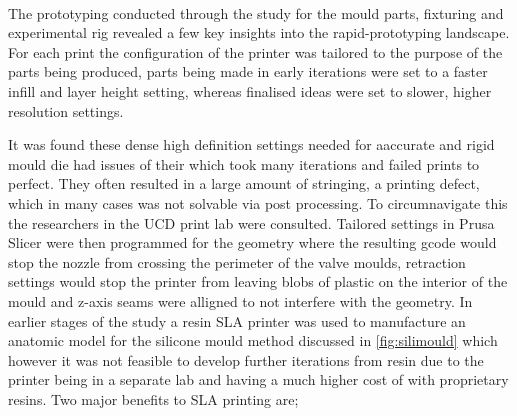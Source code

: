 \\
The prototyping conducted through the study for the mould parts, fixturing and experimental rig revealed a few key insights into the rapid-prototyping landscape. For each print the configuration of the printer was tailored to the purpose of the parts being produced, parts being made in early iterations were set to a faster infill and layer height setting, whereas finalised ideas were set to slower, higher resolution settings.

It was found these dense high definition settings needed for aaccurate and rigid mould die had issues of their which took many iterations and failed prints to perfect. They often resulted in a large amount of stringing, a printing defect, which in many cases was not solvable via post processing. To circumnavigate this the researchers in the UCD print lab were consulted. Tailored settings in Prusa Slicer were then programmed for the geometry where the resulting gcode would stop the nozzle from crossing the perimeter of the valve moulds, retraction settings would stop the printer from leaving blobs of plastic on the interior of the mould and z-axis seams were alligned to not interfere with the geometry.
\mynewline
In earlier stages of the study a resin \gls{SLA} printer was used to manufacture an anatomic model for the silicone mould method discussed in \cref{fig:silimould} which however it was not feasible to develop further iterations from resin due to the printer being in a separate lab and having a much higher cost of with proprietary resins. Two major benefits to \gls{SLA} printing are;

